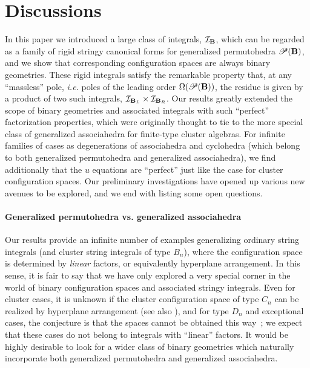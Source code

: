 \documentclass[hidelinks,12pt]{article}
\begin{document}
\section{Discussions}

In this paper we introduced a large class of integrals,  ${\cal I}_{\bf B}$, which can be regarded as a family of rigid stringy canonical forms%
for generalized permutohedra ${\mathscr P}(\bf B)$, and we show that corresponding configuration spaces are always binary geometries. These rigid integrals satisfy the remarkable property that, at any ``massless'' pole, {\it i.e.} poles of the leading order $\Omega({\mathscr P}(\bf B) )$, the residue is given by a product of two such integrals, ${\cal I}_{{\bf B}_L} \times {\cal I}_{{\bf B}_R}$. Our results greatly extended the scope of binary geometries and associated integrals with such ``perfect'' factorization properties, which were originally thought to tie to the more special class of generalized associahedra for finite-type cluster algebras. For infinite families of cases as degenerations of associahedra and cyclohedra (which belong to both generalized permutohedra and generalized associahedra), we find additionally that the $u$ equations are ``perfect'' just like the case for cluster configuration spaces. Our preliminary investigations have opened up various new avenues to be explored, and we end with listing some open questions.

\paragraph{Generalized permutohedra vs. generalized associahedra} Our results provide an infinite number of examples generalizing ordinary string integrals (and cluster string integrals of type $B_n$), where the configuration space is determined by {\it linear} factors, or equivalently hyperplane arrangement. In this sense, it is fair to say that we have only explored a very special corner in the world of binary configuration spaces and associated stringy integrals. Even for cluster cases, it is unknown if the cluster configuration space of type $C_n$ can be realized by hyperplane arrangement (see also \cite{Li:2018mnq}), and for type $ D_n$ and exceptional cases, the conjecture is that the spaces cannot be obtained this way~\cite{Arkani-Hamed:2019plo}; we expect that these cases do not belong to integrals with ``linear'' factors. It would be highly desirable to look for a wider class of binary geometries which naturally incorporate both generalized permutohedra and generalized associahedra. 
\end{document}
